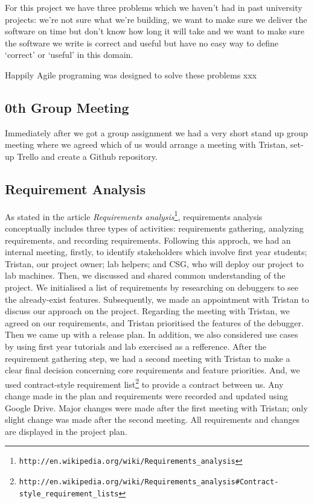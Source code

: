 \documentclass[11pt]{article}
\begin{document}
For this project we have three problems which we haven't had in past university projects: we're not sure what we're building, we want to make sure we deliver the software on time but don't know how long it will take and
we want to make sure the software we write is correct and useful but have no easy way to define `correct' or `useful' in this domain.

Happily Agile programing was designed to solve these problems xxx

\subsection{0th Group Meeting}
Immediately after we got a group assignment we had a very short stand up group meeting where we agreed which of us would arrange a meeting with Tristan, set-up Trello and create a Github repository.  

\subsection{Requirement Analysis}
As stated in the article \textit{Requirements analysis}\footnote{\tt{http://en.wikipedia.org/wiki/Requirements\_analysis}}, requirements analysis conceptually includes three types of activities: requirements gathering, analyzing requirements, and recording requirements.
Following this approch, we had an internal meeting, firstly, to identify stakeholders which involve first year students; Tristan, our project owner; lab helpers; and CSG, who will deploy our project to lab machines. Then, we discussed and shared common understanding of the project. We initialised a list of requirements by researching on debuggers to see the already-exist features. Subsequently, we made an appointment with Tristan to discuss our approach on the project. Regarding the meeting with Tristan, we agreed on our requirements, and Tristan prioritised the features of the debugger. Then we came up with a release plan. In addition, we also considered use cases by using first year tutorials and lab exercised as a refference. After the requirement gathering step, we had a second meeting with Tristan to make a clear final decision concerning core requirements and feature priorities. And, we used contract-style requirement list\footnote{\tt{http://en.wikipedia.org/wiki/Requirements\_analysis\#Contract-style\_requirement\_lists}} to provide a contract between us.
Any change made in the plan and requirements were recorded and updated using Google Drive. Major changes were made after the first meeting with Tristan; only slight change was made after the second meeting.
All requirements and changes are displayed in the project plan.
\end{document}
